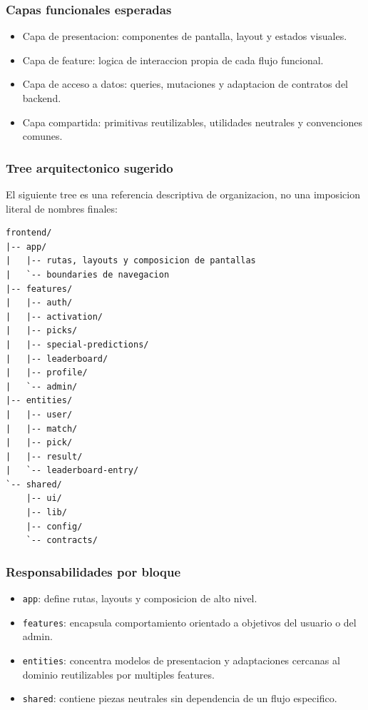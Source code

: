 \subsubsection{Capas funcionales esperadas}

\begin{itemize}
  \item Capa de presentacion: componentes de pantalla, layout y estados visuales.
  \item Capa de feature: logica de interaccion propia de cada flujo funcional.
  \item Capa de acceso a datos: queries, mutaciones y adaptacion de contratos del backend.
  \item Capa compartida: primitivas reutilizables, utilidades neutrales y convenciones comunes.
\end{itemize}

\subsubsection{Tree arquitectonico sugerido}

El siguiente tree es una referencia descriptiva de organizacion, no una imposicion literal de nombres finales:

\begin{verbatim}
frontend/
|-- app/
|   |-- rutas, layouts y composicion de pantallas
|   `-- boundaries de navegacion
|-- features/
|   |-- auth/
|   |-- activation/
|   |-- picks/
|   |-- special-predictions/
|   |-- leaderboard/
|   |-- profile/
|   `-- admin/
|-- entities/
|   |-- user/
|   |-- match/
|   |-- pick/
|   |-- result/
|   `-- leaderboard-entry/
`-- shared/
    |-- ui/
    |-- lib/
    |-- config/
    `-- contracts/
\end{verbatim}

\subsubsection{Responsabilidades por bloque}

\begin{itemize}
  \item \texttt{app}: define rutas, layouts y composicion de alto nivel.
  \item \texttt{features}: encapsula comportamiento orientado a objetivos del usuario o del admin.
  \item \texttt{entities}: concentra modelos de presentacion y adaptaciones cercanas al dominio reutilizables por multiples features.
  \item \texttt{shared}: contiene piezas neutrales sin dependencia de un flujo especifico.
\end{itemize}

